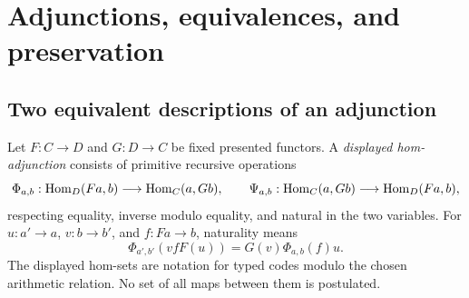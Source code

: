 \section{Adjunctions, equivalences, and preservation}\label{sec:adjunctions}

\subsection{Two equivalent descriptions of an adjunction}

Let $F:C\to D$ and $G:D\to C$ be fixed presented functors.  A
\emph{displayed hom-adjunction} consists of primitive recursive operations
\[
 \Phi_{a,b}:\operatorname{Hom}_D(Fa,b)\longrightarrow\operatorname{Hom}_C(a,Gb),\qquad
 \Psi_{a,b}:\operatorname{Hom}_C(a,Gb)\longrightarrow\operatorname{Hom}_D(Fa,b),
\]
respecting equality, inverse modulo equality, and natural in the two
variables.  For $u:a'\to a$, $v:b\to b'$, and $f:Fa\to b$, naturality means
\[
 \Phi_{a',b'}(v f F(u))=G(v)\Phi_{a,b}(f)u.
\]
The displayed hom-sets are notation for typed codes modulo the chosen
arithmetic relation.  No set of all maps between them is postulated.

